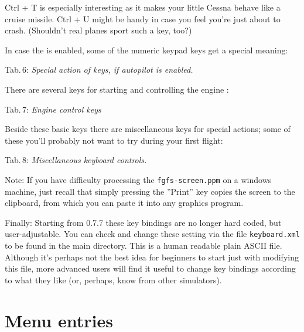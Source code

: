 \noindent Ctrl + T is especially interesting as it makes your little Cessna behave
like a cruise missile. Ctrl + U might be handy in case you feel you're just about to
crash. (Shouldn't real planes sport such a key, too?)

In case the  is enabled, some of the numeric keypad keys get a special
meaning:

\noindent
 Tab.\,6: \textit{Special action of keys, if autopilot is enabled.}
\medskip

\centerline{}
\medskip

There are several keys for starting and controlling the engine :

\noindent
 Tab.\,7: \textit{Engine control keys}
\medskip

\centerline{}
\medskip

Beside these basic keys there are miscellaneous keys for special actions; some of these you'll probably not want to try during your first flight:

\noindent Tab.\,8: \textit{Miscellaneous keyboard controls.}
\medskip

\centerline{}
\medskip

\noindent
 Note: If you have difficulty processing the  \texttt{fgfs-screen.ppm}
on a windows machine, just recall that simply pressing the ''Print'' key copies the
screen to the clipboard, from which you can paste it into any graphics program.

Finally: Starting from \FlightGear{} 0.7.7  these key bindings are no longer hard coded, but user-adjustable. You can check and change these setting via the file \texttt{keyboard.xml} to
be found in the main \FlightGear{} directory. This is a human readable plain ASCII file.
Although it's perhaps not the best idea for beginners to start just with modifying this
file, more advanced users will find it useful to change key bindings according to what
they like (or, perhaps, know from other simulators).

\section{Menu entries}

